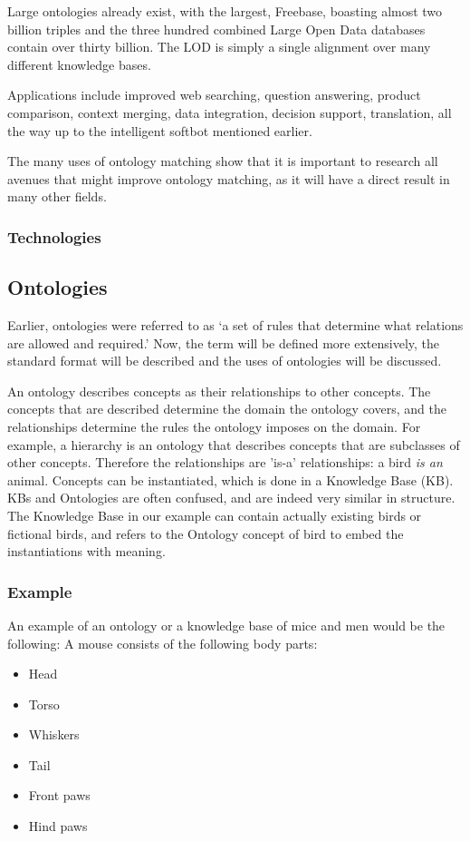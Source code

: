 \documentclass{article}
\begin{document}
 Large ontologies already exist, with the largest, Freebase, boasting almost two billion triples and the three hundred combined Large Open Data databases contain over thirty billion\cite{dbpedia, lod}. The LOD is simply a single alignment over many different knowledge bases.
 
 Applications include improved web searching, question answering, product comparison, context merging, data integration, decision support, translation, all the way up to the intelligent softbot mentioned earlier. \cite{schreiber, future}
 
 The many uses of ontology matching show that it is important to research all avenues that might improve ontology matching, as it will have a direct result in many other fields.
 \subsubsection{Technologies}
 
 \subsection{Ontologies}
 Earlier, ontologies were referred to as `a set of rules that determine what relations are allowed and required.' Now, the term will be defined more extensively, the standard format will be described and the uses of ontologies will be discussed.
 
 An ontology describes concepts as their relationships to other concepts. The concepts that are described determine the domain the ontology covers, and the relationships determine the rules the ontology imposes on the domain. For example, a hierarchy is an ontology that describes concepts that are subclasses of other concepts. Therefore the relationships are 'is-a' relationships: a bird \emph{is an} animal.
 Concepts can be instantiated, which is done in a Knowledge Base (KB). KBs and Ontologies are often confused, and are indeed very similar in structure. The Knowledge Base in our example can contain actually existing birds or fictional birds, and refers to the Ontology concept of bird to embed the instantiations with meaning\cite{ontologyGuru}.
 
 \subsubsection{Example} \label{example}
 An example of an ontology or a knowledge base of mice and men would be the following:
 A mouse consists of the following body parts:
 \begin{itemize}
 \item Head
 \item Torso
 \item Whiskers
 \item Tail
 \item Front paws
 \item Hind paws
 \end{itemize}
 
\end{document}
